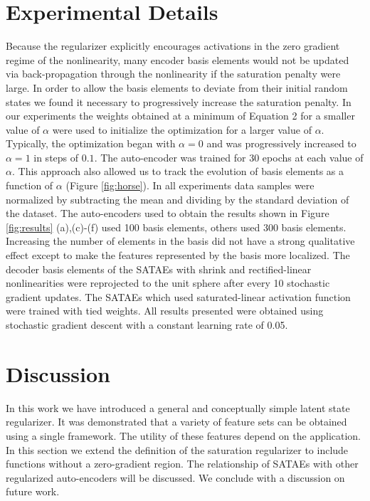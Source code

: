 \documentclass{article} %
\begin{document}
\section{Experimental Details}
Because the regularizer explicitly encourages activations in the zero gradient regime of the nonlinearity, many encoder basis elements would not be updated via back-propagation through the nonlinearity if the saturation penalty were large. In order to allow the basis elements to deviate from their initial random states we found it necessary to progressively increase the saturation penalty. In our experiments the weights obtained at a minimum of Equation 2 for a smaller value of $\alpha$ were used to initialize the optimization for a larger value of $\alpha$. Typically, the optimization began with $\alpha=0$ and was progressively increased to $\alpha=1$ in steps of $0.1$. The auto-encoder was trained for 30 epochs at each value of $\alpha$. This approach also allowed us to track the evolution of basis elements as a function of $\alpha$ (Figure \ref{fig:horse}). In all experiments data samples were normalized by subtracting the mean and dividing by the standard deviation of the dataset. The auto-encoders used to obtain the results shown in Figure \ref{fig:results} (a),(c)-(f) used 100 basis elements, others used 300 basis elements. Increasing the number of elements in the basis did not have a strong qualitative effect except to make the features represented by the basis more localized. The decoder basis elements of the SATAEs with shrink and rectified-linear nonlinearities were reprojected to the unit sphere after every 10 stochastic gradient updates. The SATAEs which used saturated-linear activation function were trained with tied weights.  All results presented were obtained using stochastic gradient descent with a constant learning rate of 0.05.

\section{Discussion}

In this work we have introduced a general and conceptually simple latent state regularizer. It was demonstrated that a variety of feature sets can be obtained using a single framework. The utility of these features depend on the application. In this section we extend the definition of the saturation regularizer to include functions without a zero-gradient region. The relationship of SATAEs with other regularized auto-encoders will be discussed. We conclude with a discussion on future work.   
\end{document}
